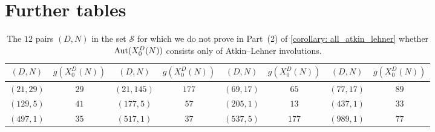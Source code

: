 \documentclass[11pt,reqno]{amsart}
\newcommand{\Aut}{{\rm Aut}}
\theoremstyle{definition}
\begin{document}
\section{Further tables}\label{tables_section}


\begin{longtable}{|c|c||c|c||c|c||c|c|}
\caption{The $12$ pairs $(D,N)$ in the set $\mathcal{S}$ for which we do not prove in Part~(2) of \cref{corollary: all_atkin_lehner} whether $\Aut(X_0^D(N))$ consists only of Atkin--Lehner involutions.}\label{table: unknown_automorphism_group} \\ \hline
$(D,N)$ & $g(X_0^D(N))$ & $(D,N)$ & $g(X_0^D(N))$ & $(D,N)$ & $g(X_0^D(N))$ & $(D,N)$ & $g(X_0^D(N))$\\ \hline \hline
$ (
21 , 29 )$ & $ 29 $
 & 
$ (
21 , 145 )$ & $ 177 $
 & 
$ (
69 , 17 )$ & $ 65 $
 & 
$ (
77 , 17 )$ & $ 89 $
\\ \hline
$ (
129 , 5 )$ & $ 41 $
 & 
$ (
177 , 5 )$ & $ 57 $
 & 
$ (
205 , 1 )$ & $ 13 $
 & 
$ (
437 , 1 )$ & $ 33 $
\\ \hline
$ (
497 , 1 )$ & $ 35 $
 & 
$ (
517 , 1 )$ & $ 37 $
 & 
$ (
537 , 5 )$ & $ 177 $
 & 
$ (
989 , 1 )$ & $ 77 $
\\ \hline
\end{longtable}
\end{document}
